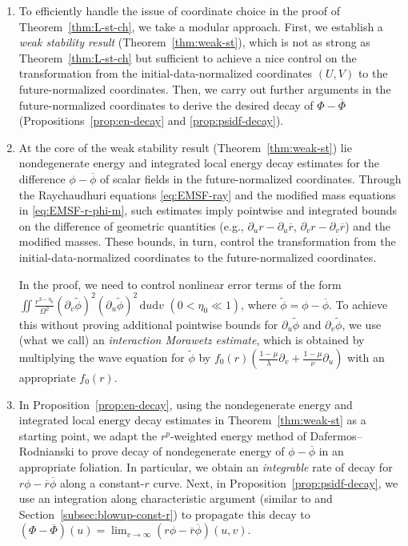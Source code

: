 \documentclass[10pt, reqno]{amsart}
\theoremstyle{definition}
\theoremstyle{remark}
\theoremstyle{conjecture}
\numberwithin{equation}{section}
\newcommand{\ud}{\mathrm{d}}
\newcommand{\rd}{\partial}
\newcommand{\0}{\emptyset}
\newcommand{\lmb}{\lambda}
\newcommand{\Omg}{\Omega}
\newcommand{\dur}{\nu}
\newcommand{\dvr}{\lmb}
\newcommand{\phibg}{\overline{\phi}}				%
\newcommand{\rbg}{\overline{r}}					%
\newcommand{\Phibg}{\overline{\Phi}}				%
\newcommand{\phidf}{\widetilde{\phi}}				%
\begin{document}
\begin{enumerate}
\item To efficiently handle the issue of coordinate choice in the proof of Theorem~\ref{thm:L-st-ch}, we take a modular approach. First, we establish a \emph{weak stability result} (Theorem~\ref{thm:weak-st}), which is not as strong as Theorem~\ref{thm:L-st-ch} but sufficient to achieve a nice control on the transformation from the initial-data-normalized coordinates $(U, V)$ to the future-normalized coordinates. Then, we carry out further arguments in the future-normalized coordinates to derive the desired decay of $\Phi - \Phibg$ (Propositions~\ref{prop:en-decay} and \ref{prop:psidf-decay}).

\item At the core of the weak stability result (Theorem~\ref{thm:weak-st}) lie nondegenerate energy and integrated local energy decay estimates for the difference $\phi - \phibg$ of scalar fields in the future-normalized coordinates. Through the Raychaudhuri equations \eqref{eq:EMSF-ray} and the modified mass equations in \eqref{eq:EMSF-r-phi-m}, such estimates imply pointwise and integrated bounds on the difference of geometric quantities (e.g., $\rd_{u} r - \rd_{u} \rbg$, $\rd_{v} r - \rd_{v} \rbg$) and the modified masses. These bounds, in turn, control the transformation from the initial-data-normalized coordinates to the future-normalized coordinates.

In the proof, we need to control nonlinear error terms of the form $\iint \frac{r^{3-\eta_{0}}}{\Omg^{2}} (\rd_{v} \phidf)^{2} (\rd_{u} \phidf)^{2} \, \ud u \ud v$ $(0 < \eta_{0} \ll 1)$, where $\phidf = \phi - \phibg$. To achieve this without proving additional pointwise bounds for $\rd_{u} \phidf$ and $\rd_{v} \phidf$, we use (what we call) an \emph{interaction Morawetz estimate}, which is obtained by multiplying the wave equation for $\phidf$ by $f_{0}(r) \left( \frac{1-\mu}{\dvr} \rd_{v} + \frac{1-\mu}{\dur} \rd_{u}\right)$ with an appropriate $f_{0}(r)$.

\item In Proposition~\ref{prop:en-decay}, using the nondegenerate energy and integrated local energy decay estimates in Theorem~\ref{thm:weak-st} as a starting point, we adapt the $r^{p}$-weighted energy method of Dafermos--Rodnianski \cite{DRNM} to prove decay of nondegenerate energy of $\phi - \phibg$ in an appropriate foliation. In particular, we obtain an \emph{integrable} rate of decay for $r \phi - \rbg \phibg$ along a constant-$r$ curve. Next, in Proposition~\ref{prop:psidf-decay}, we use an integration along characteristic argument (similar to \cite{LO1} and Section~\ref{subsec:blowup-const-r}) to propagate this decay to $(\Phi - \Phibg) (u)= \lim_{v \to \infty}(r \phi - \rbg \phibg)(u, v)$.
\end{enumerate}
\end{document}
